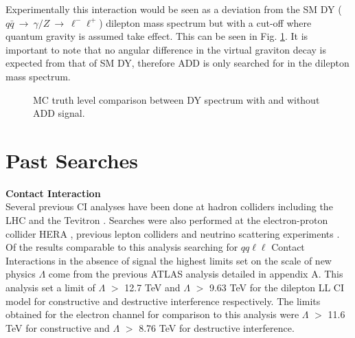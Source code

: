         Experimentally this interaction would be seen as a deviation from the SM DY ($q\bar{q}~\rightarrow~\gamma/Z~\rightarrow~\ell^{-}\ell^{+}$) dilepton mass spectrum but with a cut-off where quantum gravity is assumed take effect. This can be seen in Fig. \ref{fig:theoryInvMassADD}. It is important to note that no angular difference in the virtual graviton decay is expected from that of SM DY, therefore ADD is only searched for in the dilepton mass spectrum.

        \begin{figure}[h]
            \begin{center}
            \end{center}
            \caption{MC truth level comparison between DY spectrum with and without ADD signal.}
            \label{fig:theoryInvMassADD}
        \end{figure}



\section{Past Searches}

    {\bf Contact Interaction}\\
        Several previous CI analyses have been done at hadron colliders including the LHC \cite{PhysRevD.87.015010,ATLAS:2012pu,PhysRevD.87.032001,PhysRevD.87.052017} and the Tevitron \cite{PhysRevLett.103.191803,PhysRevLett.96.211801,PhysRevLett.87.231803,PhysRevLett.82.4769,PhysRevLett.79.2198}. Searches were also performed at the electron-proton collider HERA \cite{Chekanov200423,Adloff200335}, previous lepton colliders \cite{Abdallah2009.60.1,Schael2007.49.411,Abdallah2006.45.589,Abbiendi2004.33.173,Acciarri200081} and neutrino scattering experiments \cite{}. Of the results comparable to this analysis searching for $qq\ell\ell$ Contact Interactions in the absence of signal the highest limits set on the scale of new physics $\Lambda$ come from the previous ATLAS analysis \cite{PhysRevD.87.015010} detailed in appendix A. This analysis set a limit of $\Lambda$ $>$ 12.7 TeV and $\Lambda$ $>$ 9.63 TeV for the dilepton LL CI model for constructive and destructive interference respectively. The limits obtained for the electron channel for comparison to this analysis were $\Lambda$ $>$ 11.6 TeV for constructive and $\Lambda$ $>$ 8.76 TeV for destructive interference. \\


